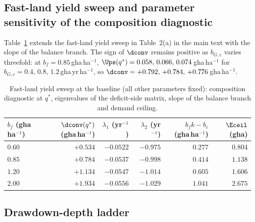 \subsection{Fast-land yield sweep and parameter sensitivity of the composition diagnostic}\label{si:sweep}

Table~\ref{tab:si_sweep} extends the fast-land yield sweep in Table~2(a) in the main text with the slope of the balance branch. The sign of $\dconv$ remains positive as $b_{G,c}$ varies threefold: at $b_f=0.85$\,gha\,ha$^{-1}$, $\Ups(q^*)=0.058,\,0.066,\,0.074$\,gha\,ha$^{-1}$ for $b_{G,c}=0.4,\,0.8,\,1.2$\,gha\,yr\,ha$^{-1}$, so $\dconv=+0.792,\,+0.784,\,+0.776$\,gha\,ha$^{-1}$.

\begin{table}[htbp]
\centering\small
\caption{Fast-land yield sweep at the baseline (all other parameters fixed): composition diagnostic at $q^*$, eigenvalues of the deficit-side matrix, slope of the balance branch and demand ceiling.}
\label{tab:si_sweep}
\begin{tabular}{l r r r r r}
\toprule
$b_f$ (gha\,ha$^{-1}$) & $\dconv(q^*)$ (gha\,ha$^{-1}$) & $\lambda_1$ (yr$^{-1}$) & $\lambda_2$ (yr$^{-1}$) & $b_fk-b_c$ (gha\,ha$^{-1}$) & $\Eceil$ (gha) \\
\midrule
$0.60$ & $+0.534$ & $-0.0522$ & $-0.975$ & $0.277$ & $0.804$ \\
$0.85$ & $+0.784$ & $-0.0537$ & $-0.998$ & $0.414$ & $1.138$ \\
$1.20$ & $+1.134$ & $-0.0547$ & $-1.014$ & $0.605$ & $1.606$ \\
$2.00$ & $+1.934$ & $-0.0556$ & $-1.029$ & $1.041$ & $2.675$ \\
\bottomrule
\end{tabular}
\end{table}

\subsection{Drawdown-depth ladder}\label{si:ladder}

